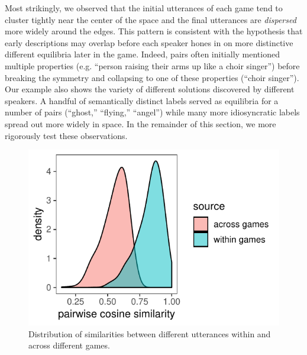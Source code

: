 \documentclass[alpha-refs]{wiley-article}
\begin{document}
Most strikingly, we observed that the initial utterances of each game tend to cluster tightly near the center of the space and the final utterances are \emph{dispersed} more widely around the edges. 
This pattern is consistent with the hypothesis that early descriptions may overlap before each speaker hones in on more distinctive different equilibria later in the game.
Indeed, pairs often initially mentioned multiple properties (e.g. ``person raising their arms up like a choir singer'') before breaking the symmetry and collapsing to one of these properties (``choir singer'').
Our example also shows the variety of different solutions discovered by different speakers. 
A handful of semantically distinct labels served as equilibria for a number of pairs (``ghost,'' ``flying,'' ``angel'') while many more idiosyncratic labels spread out more widely in space.
In the remainder of this section, we more rigorously test these observations.

\begin{figure}[t!]
\centering
\includegraphics[scale=.75]{across_vs_within.pdf}
\caption{Distribution of similarities between different utterances within and across different games.}
\label{fig:withinvsacross}
\end{figure}
\end{document}
